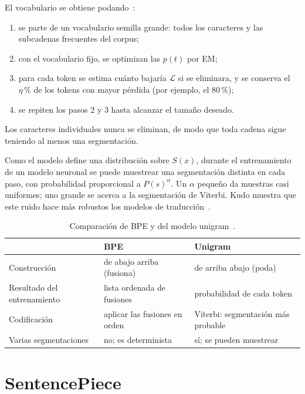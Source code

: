 El vocabulario se obtiene podando~\cite[§3.2]{kudo}:
\begin{enumerate}[label=\arabic*.]
  \item se parte de un vocabulario semilla grande: todos los caracteres y las subcadenas frecuentes del corpus;
  \item con el vocabulario fijo, se optimizan las $p(t)$ por EM;
  \item para cada token se estima cuánto bajaría $\mathcal{L}$ si se eliminara, y se conserva el $\eta\,\%$ de los tokens con mayor pérdida (por ejemplo, el $80\,\%$);
  \item se repiten los pasos 2 y 3 hasta alcanzar el tamaño deseado.
\end{enumerate}
Los caracteres individuales nunca se eliminan, de modo que toda cadena sigue teniendo al menos una segmentación.

\begin{observacion}
Como el modelo define una distribución sobre $S(x)$, durante el entrenamiento de un modelo neuronal se puede muestrear una segmentación distinta en cada paso, con probabilidad proporcional a $P(s)^{\alpha}$. Un $\alpha$ pequeño da muestras casi uniformes; uno grande se acerca a la segmentación de Viterbi. Kudo muestra que este ruido hace más robustos los modelos de traducción~\cite[§3.3]{kudo}.
\end{observacion}

\begin{table}[h]
\centering\small
\caption{Comparación de BPE y del modelo unigram~\cite[§3.4]{kudo}.}\label{tab:bpe-unigram}
\begin{tabular}{@{}lll@{}}
\toprule
 & BPE & Unigram \\
\midrule
Construcción & de abajo arriba (fusiona) & de arriba abajo (poda) \\
Resultado del entrenamiento & lista ordenada de fusiones & probabilidad de cada token \\
Codificación & aplicar las fusiones en orden & Viterbi: segmentación más probable \\
Varias segmentaciones & no; es determinista & sí; se pueden muestrear \\
\bottomrule
\end{tabular}
\end{table}

\section{SentencePiece}

